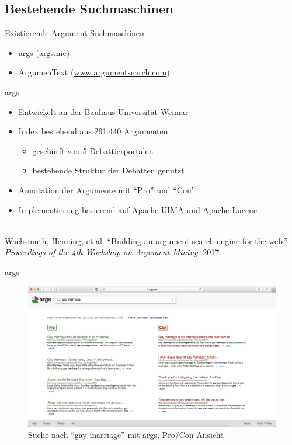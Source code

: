 \documentclass{beamer}
\begin{document}
	\subsection{Bestehende Suchmaschinen}
	\begin{frame}{Existierende Argument-Suchmaschinen}
		\begin{itemize}
			\item args (\url{args.me})
			\item ArgumenText (\url{www.argumentsearch.com})
		\end{itemize}
	\end{frame}
	\begin{frame}{args}
		\begin{itemize}
			\item Entwickelt an der Bauhaus-Universität Weimar
			\item Index bestehend aus 291.440 Argumenten
			\begin{itemize}
				\item geschürft von 5 Debattierportalen
				\item bestehende Struktur der Debatten genutzt
			\end{itemize}
			\item Annotation der Argumente mit ``Pro'' und ``Con''
			\item Implementierung basierend auf Apache UIMA und Apache Lucene
		\end{itemize}
		~\\
		\tiny Wachsmuth, Henning, et al. ``Building an argument search engine for the web.''
		\textit{Proceedings of the 4th Workshop on Argument Mining}. 2017.
	\end{frame}
	\begin{frame}{args}
		\begin{figure}
			\includegraphics[width=\textwidth]{img/args-screenshot-gay-marriage}
			\caption{Suche nach ``gay marriage'' mit args, Pro/Con-Ansicht}
		\end{figure}
	\end{frame}
\end{document}
